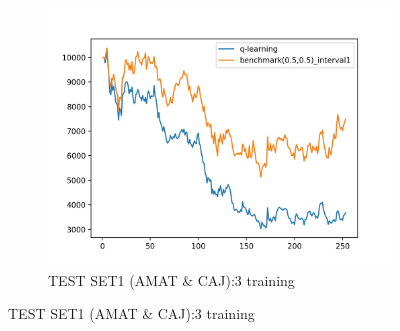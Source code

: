 \begin{figure}[H]
\begin{subfigure}{.5\textwidth}
\includegraphics[clip, width=1.1\textwidth]{Graphics/test_LP3_AC_action.jpg} \caption{TEST SET1 (AMAT \& CAJ):3 training}
\end{subfigure}%
\end{figure}%

\newpage

